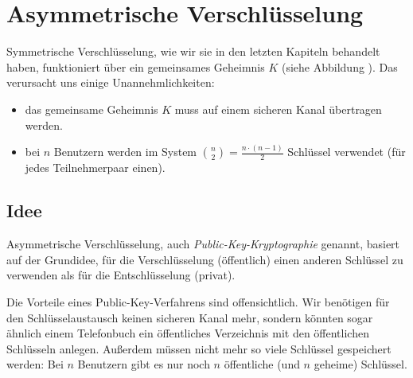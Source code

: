 \chapter{Asymmetrische Verschlüsselung}
\label{ch:asymmenc}

Symmetrische Verschlüsselung, wie wir sie in den letzten Kapiteln behandelt haben, funktioniert über ein gemeinsames Geheimnis $K$ (siehe Abbildung
).
Das verursacht uns einige Unannehmlichkeiten:

\begin{itemize}
  \item das gemeinsame Geheimnis $K$ muss auf einem sicheren Kanal übertragen werden.
  \item bei $n$ Benutzern werden im System $\binom{n}{2} = \frac{n \cdot (n-1)}{2}$ Schlüssel verwendet (für jedes Teilnehmerpaar einen).
\end{itemize}

%






\section{Idee}
Asymmetrische Verschlüsselung\indexEncryptionAsymm, auch \emph{Public-Key-Kryptographie}
genannt,  basiert auf der Grundidee, für die Verschlüsselung
(öffentlich) einen anderen Schlüssel zu verwenden als für die
Entschlüsselung (privat).

Die Vorteile eines Public-Key-Verfahrens sind offensichtlich. Wir
benötigen für den Schlüsselaustausch keinen sicheren Kanal mehr, sondern
könnten sogar ähnlich einem Telefonbuch ein öffentliches Verzeichnis mit
den öffentlichen Schlüsseln anlegen. Außerdem müssen nicht mehr so viele
Schlüssel gespeichert werden: Bei $n$ Benutzern gibt es nur noch $n$
öffentliche (und $n$ geheime) Schlüssel. 

